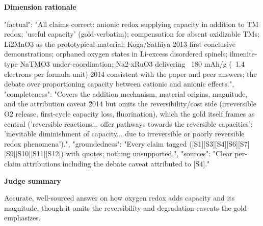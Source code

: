 \documentclass[10pt]{article}
\begin{document}
\textbf{Dimension rationale}
\begin{EvidenceText}
{
  "factual": "All claims correct: anionic redox supplying capacity in addition to TM redox; 'useful capacity' (gold-verbatim); compensation for absent oxidizable TMs; Li2MnO3 as the prototypical material; Koga/Sathiya 2013 first conclusive demonstrations; orphaned oxygen states in Li-excess disordered spinels; ilmenite-type NaTMO3 under-coordination; Na2-xRuO3 delivering ~180 mAh/g (~1.4 electrons per formula unit) \u2014 consistent with the paper and peer answers; the debate over proportioning capacity between cationic and anionic effects.",
  "completeness": "Covers the addition mechanism, material origins, magnitude, and the attribution caveat \u2014 but omits the reversibility/cost side (irreversible O2 release, first-cycle capacity loss, fluorination), which the gold itself frames as central ('reversible reactions... offer pathways towards the reversible capacities'; 'inevitable diminishment of capacity... due to irreversible or poorly reversible redox phenomena').",
  "groundedness": "Every claim tagged ([S1][S3][S4][S6][S7][S9][S10][S11][S12]) with quotes; nothing unsupported.",
  "sources": "Clear per-claim attributions including the debate caveat attributed to [S4]."
}
\end{EvidenceText}

\textbf{Judge summary}
\begin{EvidenceText}
Accurate, well-sourced answer on how oxygen redox adds capacity and its magnitude, though it omits the reversibility and degradation caveats the gold emphasizes.
\end{EvidenceText}
\end{document}
